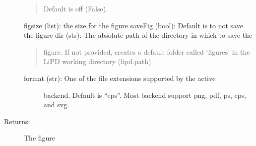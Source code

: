 \documentclass[letterpaper,10pt,english]{sphinxmanual}
\begin{document}
\begin{fulllineitems}
\begin{description}
\begin{quote}
Default is off (False).
\end{quote}

figsize (list): the size for the figure
saveFig (bool): Default is to not save the figure
dir (str): The absolute path of the directory in which to save the
\begin{quote}

figure. If not provided, creates a default folder called ‘figures’
in the LiPD working directory (lipd.path).
\end{quote}
\begin{description}
\item[{format (str): One of the file extensions supported by the active}] \leavevmode
backend. Default is “eps”. Most backend support png, pdf, ps, eps,
and svg.

\end{description}

\item[{Returns:}] \leavevmode
The figure

\end{description}

\end{fulllineitems}

\end{document}
